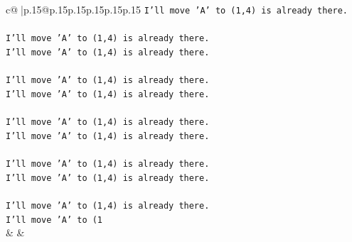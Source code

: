 \documentclass{article}
\begin{document}
{\begin{supertabular}{c@{$\;$}|p{.15\linewidth}@{}p{.15\linewidth}p{.15\linewidth}p{.15\linewidth}p{.15\linewidth}p{.15\linewidth}}
{{{\texttt{I'll move 'A' to (1,4) is already there.} \\
\\ 
\texttt{I'll move 'A' to (1,4) is already there.} \\
\texttt{I'll move 'A' to (1,4) is already there.} \\
\\ 
\texttt{I'll move 'A' to (1,4) is already there.} \\
\texttt{I'll move 'A' to (1,4) is already there.} \\
\\ 
\texttt{I'll move 'A' to (1,4) is already there.} \\
\texttt{I'll move 'A' to (1,4) is already there.} \\
\\ 
\texttt{I'll move 'A' to (1,4) is already there.} \\
\texttt{I'll move 'A' to (1,4) is already there.} \\
\\ 
\texttt{I'll move 'A' to (1,4) is already there.} \\
\texttt{I'll move 'A' to (1} \\
            }
        }
    }
    & & \\ \\


\end{supertabular}}
\end{document}
